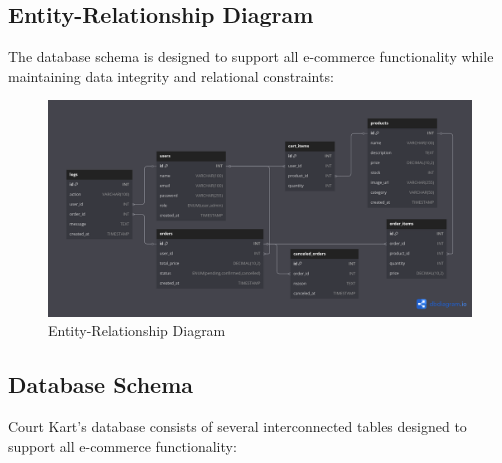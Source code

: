 \documentclass[14pt,a4paper]{article}
\begin{document}
\subsection{Entity-Relationship Diagram}
The database schema is designed to support all e-commerce functionality while maintaining data integrity and relational constraints:

\begin{figure}[H]
	\centering
	\includegraphics[width=1\textwidth]{../public/assets/images/db-schema.png}
	\caption{Entity-Relationship Diagram}
\end{figure}

\subsection{Database Schema}
Court Kart's database consists of several interconnected tables designed to support all e-commerce functionality:
\end{document}
